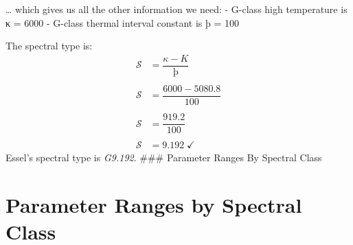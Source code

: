 \documentclass[
  letterpaper,
]{book}
\begin{document}
\ldots{} which gives us all the other information we need: - G-class
high temperature is κ = 6000 - G-class thermal interval constant is þ =
100

The spectral type is: \[
\begin{align}
\mathcal{S} &= \dfrac{\kappa - K}{þ} \\ \\
\mathcal{S} &= \dfrac{6000 - 5080.8}{100} \\ \\
\mathcal{S} &= \dfrac{919.2}{100} \\ \\
\mathcal{S} &= 9.192\;✓
\end{align}
\] Essel's spectral type is \emph{G9.192}. \#\#\# Parameter Ranges By
Spectral Class

\chapter{Parameter Ranges by Spectral
Class}\label{parameter-ranges-by-spectral-class}
\end{document}
